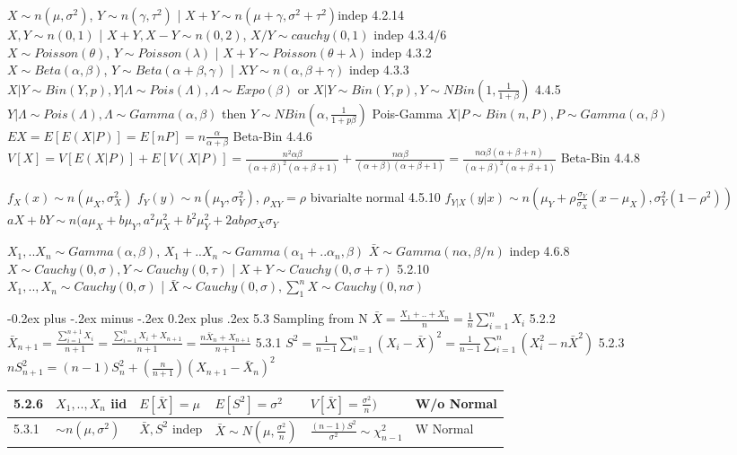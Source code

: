 \documentclass[10pt,landscape]{article}
\makeatletter
\renewcommand{\subsection}{\@startsection{subsection}{2}{0mm}%
                                {-0.2ex plus -.2ex minus -.2ex}%
                                {0.2ex plus .2ex}%
                                {\normalfont\normalsize\bfseries}}
\makeatother
\begin{document}
\begin{multicols}{1}
$X\sim n(\mu,\sigma^2)$, $Y\sim n(\gamma,\tau^2)$ | $X+Y\sim n(\mu+\gamma,\sigma^2+\tau^2)$indep  4.2.14\\
$X, Y\sim n(0,1)$ | $X+Y, X-Y\sim n(0,2)$, $X/Y\sim cauchy(0,1)$ indep 4.3.4/6 \\
$X\sim Poisson(\theta)$, $Y\sim Poisson(\lambda)$ | $X+Y\sim Poisson(\theta+\lambda)$ indep 4.3.2 \\
$X\sim Beta(\alpha,\beta)$, $Y\sim Beta(\alpha+\beta,\gamma)$ | $XY\sim n(\alpha,\beta+\gamma)$ indep 4.3.3\\
$X|Y\sim Bin(Y,p), Y|\Lambda\sim Pois(\Lambda), \Lambda\sim Expo(\beta)$ or $X|Y\sim Bin(Y,p), Y\sim NBin(1,\frac1{1+\beta})$ 4.4.5\\
$Y|\Lambda\sim Pois(\Lambda), \Lambda\sim Gamma(\alpha,\beta)$ then $Y\sim NBin(\alpha,\frac1{1+p\beta})$ Pois-Gamma
$X|P\sim Bin(n,P), P\sim Gamma(\alpha,\beta)$ $EX=E[E(X|P)]=E[nP]=n\frac{\alpha}{\alpha+\beta}$ Beta-Bin 4.4.6
$V[X]=V[E(X|P)]+E[V(X|P)]=\frac{n^2\alpha\beta}{(\alpha+\beta)^2(\alpha+\beta+1)}+\frac{n\alpha\beta}{(\alpha+\beta)(\alpha+\beta+1)}=\frac{n\alpha\beta(\alpha+\beta+n)}{(\alpha+\beta)^2(\alpha+\beta+1)}$ Beta-Bin 4.4.8 

$f_X(x)\sim n(\mu_X,\sigma^2_X)$ $f_Y(y)\sim n(\mu_Y,\sigma^2_Y)$, $\rho_{XY}=\rho$ bivarialte normal 4.5.10
$f_{Y|X}(y|x) \sim n\left(\mu_Y+\rho\frac{\sigma_Y}{\sigma_X}(x-\mu_X),\sigma_Y^2(1-\rho^2)\right)$
$aX+bY\sim n(a\mu_X+b\mu_Y,a^2\mu_X^2+b^2\mu_Y^2+2ab\rho\sigma_X\sigma_Y$

$X_1,..X_n\sim Gamma(\alpha,\beta)$, $X_1+..X_n\sim Gamma(\alpha_1+..\alpha_n,\beta)$ $\bar X\sim Gamma(n\alpha,\beta/n)$ indep 4.6.8\\
$X\sim Cauchy(0,\sigma), Y\sim Cauchy(0,\tau)$ | $X+Y\sim Cauchy(0,\sigma+\tau)$ 5.2.10\\
$X_1,..,X_n\sim Cauchy(0,\sigma)$ | $\bar X\sim Cauchy(0,\sigma),\sum_{1}^{n} X\sim Cauchy(0,n\sigma)$

\subsection{5.3 Sampling from N}
$\bar X=\frac{X_1+..+X_n}{n}=\frac1n\sum_{i=1}^nX_i$ 5.2.2 $\bar X_{n+1}=\frac{\sum_{i=1}^{n+1}X_{i}}{n+1}=\frac{\sum_{i=1}^{n}X_{i}+X_{n+1}}{n+1}=\frac{n\bar X_{n}+X_{n+1}}{n+1}$ 5.3.1
$S^2=\frac1{n-1}\sum_{i=1}^n(X_i-\bar X)^2=\frac1{n-1}\sum_{i=1}^n(X_i^2-n\bar X^2)$ 5.2.3 $nS^2_{n+1}=(n-1)S_n^2+(\frac{n}{n+1})(X_{n+1}-\bar X_n)^2$

\begin{tabular}{ll|l|l|l|l}
5.2.6 & $X_1,..,X_n$ iid  & $E[\bar X]=\mu$ & $E[S^2]=\sigma^2$ & $V[\bar X]=\frac{\sigma^2}n)$ & W/o Normal\\\hline
5.3.1 & $\sim n(\mu,\sigma^2)$ & $\bar X,S^2$ indep & $\bar X\sim N(\mu,\frac{\sigma^2}n)$ & $\frac{(n-1)S^2}{\sigma^2}\sim\chi^2_{n-1}$ & W  Normal\\
\end{tabular}


\end{multicols}
\end{document}
